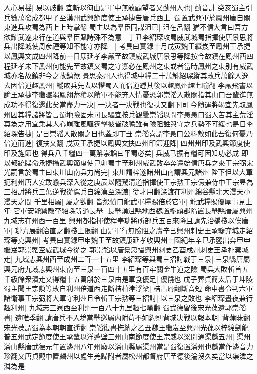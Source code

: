 人心易揺|{
	易以豉翻}
宜斬以徇由是軍中無敢顧望者乂薊州人也|{
	薊音計}
癸亥蜀主引兵數萬發成都甲子至漢州武興節度使王承捷告唐兵西上|{
	蜀置武興軍於鳳州唐自關東進兵攻蜀為西上上時掌翻}
蜀主以為羣臣同謀沮已|{
	沮在呂翻}
猶不信大言曰吾方欲耀武遂東行在道與羣臣賦詩殊不為意　丁丑李紹琛攻蜀威武城蜀指揮使唐景思將兵出降城使周彦禋等知不能守亦降　|{
	考異曰實録十月戊寅魏王繼岌至鳳州王承捷以鳳興文成四州降前一日康延孝李嚴至故鎮威武城唐景思等降按今故鎮在鳳州西四程延孝未下鳳州何能先至故鎮又蜀之守禦必在鳳州之東或者當時鳳州之東别有威武城亦名故鎮非今之故鎮歟}
景思秦州人也得城中糧二十萬斛紹琛縱其敗兵萬餘人逸去因倍道趣鳳州|{
	縱敗兵先去以懼蜀人而倍道踵其後以趣鳳州趣七喻翻}
李嚴飛書以諭王承捷李繼曮竭鳳翔蓄積以饋軍不能充人情憂恐郭崇韜入散關指其山曰吾輩進無成功不得復還此矣當盡力一决|{
	一决者一决戰也復扶又翻下同}
今饋運將竭宜先取鳳州因其糧諸將皆言蜀地險固未可長驅宜按兵觀釁崇韜以問李愚愚曰蜀人苦其主荒淫莫為之用宜乘其人心崩離風驅霆擊彼皆破膽雖有險阻誰與守之兵勢不可緩也是日李紹琛告捷|{
	是日崇韜入散關之日也蓋即丁丑}
崇韜喜謂李愚曰公料敵如此吾復何憂乃倍道而進|{
	復扶又翻}
戊寅王承捷以鳳興文扶四州印節迎降|{
	四州州印及武興節度使印及旌節也}
得兵八千糧四十萬斛崇韜曰平蜀必矣|{
	兵威已振有糧可因知功必成}
即以都統牒命承捷攝武興節度使己卯蜀主至利州威武敗卒奔還始信唐兵之來王宗弼宋光嗣言於蜀主曰東川山南兵力尚完|{
	東川謂梓遂諸州山南謂興元諸州}
陛下但以大軍扼利州唐人安敢懸兵深入從之庚辰以隨駕清道指揮使王宗勲王宗儼兼侍中王宗昱為三招討將兵三萬逆戰從駕兵自綿漢至深渡|{
	從才用翻深渡在利州綿谷縣北大漫天小漫天之間}
千里相屬|{
	屬之欲翻}
皆怨憤曰龍武軍糧賜倍於它軍|{
	龍武糧賜優厚事見上年}
它軍安能禦敵李紹琛等過長舉|{
	長舉漢沮縣地西魏置盤頭郡隋置長舉縣唐屬興州九域志在州西一百里}
興州都指揮使程奉璉將所部兵五百來降且請先治橋棧以俟唐軍|{
	璉力展翻治直之翻棧士限翻}
由是軍行無險阻之虞辛巳興州刺史王承鑒弃城走紹琛等克興州|{
	考異曰實録甲申魏王至故鎮康延孝收興州十國紀年辛巳承鑒出奔甲申繼岌郭崇韜至威武城今從之}
郭崇韜以唐景思攝興州刺史乙酉成州刺史王承朴棄城走|{
	九域志興州西至成州二百一十五里}
李紹琛等與蜀三招討戰于三泉|{
	三泉縣唐屬興元府九域志興州東南至三泉一百四十五里有百牢關金牛道之險}
蜀兵大敗斬首五千級餘衆潰走又得糧十五萬斛於三泉由是軍食優足|{
	優饒也}
戊子葬貞簡太后于坤陵蜀主聞王宗勲等敗自利州倍道西走斷桔柏津浮梁|{
	桔古屑翻斷音短}
命中書令判六軍諸衛事王宗弼將大軍守利州且令斬王宗勲等三招討|{
	以三泉之敗也}
李紹琛晝夜兼行趣利州|{
	九域志三泉西至利州一百八十九里趣七喻翻}
蜀武德留後宋光葆遺郭崇韜書|{
	遺唯季翻}
請唐兵不入境當舉巡屬内附苟不如約則背城决戰以報本朝|{
	背蒲昧翻宋光葆謂蜀為本朝朝直遥翻}
崇韜復書撫納之乙丑魏王繼岌至興州光葆以梓綿劍龍普五州武定節度使王承肇以洋蓬壁三州山南節度使王宗威以梁開通渠麟五州|{
	渠州潾山縣唐武德元年置潾州八年州廢以潾山縣屬渠州當是蜀復置潾州也麟當作潾音力珍翻又唐貞觀中置麟州以處生羌歸附者屬松州都督府唐至德後淪沒久矣當以渠潾之潾為是}
